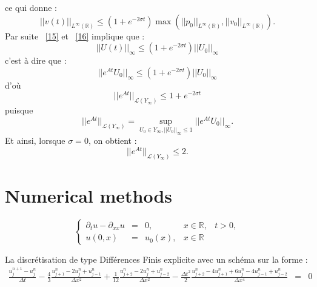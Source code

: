 \documentclass[a4paper,11pt]{article}
\begin{document}
ce qui donne :
\begin{equation}
||v(t)||_{L^{\infty}(\mathbb{R})} \leq (1+e^{-2\sigma t})\max(||p_0||_{L^{\infty}(\mathbb{R})},||v_0||_{L^{\infty}(\mathbb{R})}).
\label{16} 
\end{equation}
Par suite ~\eqref{15} et ~\eqref{16} implique que :
\begin{displaymath}
||U(t)||_{\infty} \leq (1+e^{-2\sigma t})||U_0||_{\infty}
\end{displaymath}
c'est \`a dire que :
\begin{displaymath}
||e^{At}U_0||_{\infty} \leq (1+e^{-2\sigma t})||U_0||_{\infty}
\end{displaymath}
d'o\`u
\begin{equation}
||e^{At}||_{\mathcal{L}(Y_{\infty})}\leq 1+e^{-2\sigma t}
\label{17} 
\end{equation}
puisque
\begin{displaymath}
||e^{At}||_{\mathcal{L}(Y_{\infty})}=\sup_{U_0\in Y_{\infty}, ||U_0||_{\infty} \leq 1}||e^{At}U_0||_{\infty}.
\end{displaymath}
Et ainsi, lorsque $\sigma=0$, on obtient :
\begin{equation}
||e^{At}||_{\mathcal{L}(Y_{\infty})}\leq 2.
\label{18} 
\end{equation} 















\section{Numerical methods}

\begin{equation}
    \left\{
    \begin{array}{rclll}
        \partial_{t}u - \partial_{xx}u &=& 0, &x \in \mathbb{R}, & t>0, \\
        u(0, x) &=& u_{0}(x), &x \in \mathbb{R} &
    \end{array}
    \right.
\end{equation}

La discrétisation de type Différences Finis explicite avec un schéma sur la forme :
\begin{equation}
    \begin{array}{rcl}
        \frac{u^{n+1}_{j} - u^{n}_{j}}{\Delta t}
        -\frac{4}{3} \frac{u^{n}_{j+1} - 2u^{n}_{j} + u^{n}_{j-1}}{\Delta x^{2}}
        +\frac{1}{12} \frac{u^{n}_{j+2} - 2u^{n}_{j} + u^{n}_{j-2}}{\Delta x^{2}}
        -\frac{\Delta t^{2}}{2} \frac{u^{n}_{j+2} - 4u^{n}_{j+1} + 6u^{n}_{j}  - 4u^{n}_{j-1} + u^{n}_{j-2}}{\Delta x^{4}}  &=& 0 \label{scheme}
    \end{array}
\end{equation}
\end{document}
